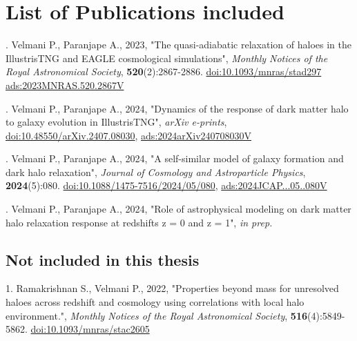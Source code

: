 \documentclass[a4paper, 12pt, oneside]{Thesis}  %
\newcommand{\doi}[1]{\href{https://doi.org/#1}{doi:#1}}
\begin{document}
\pagestyle{fancy}  %

\section*{List of Publications included}

. Velmani P., Paranjape A., 2023, "The quasi-adiabatic relaxation of haloes in the IllustrisTNG and EAGLE cosmological simulations", \textit{Monthly Notices of the Royal Astronomical Society}, 
\textbf{520}(2):2867-2886. 
\doi{10.1093/mnras/stad297}
\href{https://ui.adsabs.harvard.edu/abs/2023MNRAS.520.2867V}{ads:2023MNRAS.520.2867V}

\vspace{0.5cm}

. Velmani P., Paranjape A., 2024, "Dynamics of the response of dark matter halo to galaxy evolution in IllustrisTNG", \textit{arXiv e-prints}, 
\doi{10.48550/arXiv.2407.08030}, 
\href{https://ui.adsabs.harvard.edu/abs/2024arXiv240708030V}{ads:2024arXiv240708030V}

\vspace{0.5cm}

. Velmani P., Paranjape A., 2024, "A self-similar model of galaxy formation and dark halo relaxation", \textit{Journal of Cosmology and Astroparticle Physics}, 
\textbf{2024}(5):080. 
\doi{10.1088/1475-7516/2024/05/080},
\href{https://ui.adsabs.harvard.edu/abs/2024JCAP...05..080V}{ads:2024JCAP...05..080V}

\vspace{0.5cm}

. Velmani P., Paranjape A., 2024, "Role of astrophysical modeling on dark matter halo relaxation response at redshifts z = 0 and z = 1", \textit{in prep.}

\subsection*{Not included in this thesis}

1. Ramakrishnan S., Velmani P., 2022, "Properties beyond mass
for unresolved haloes across redshift and cosmology using correlations with local halo environment.", \textit{Monthly Notices of the Royal Astronomical Society}, 
\textbf{516}(4):5849-5862. 
\doi{10.1093/mnras/stac2605}


\tableofcontents  %
\end{document}
